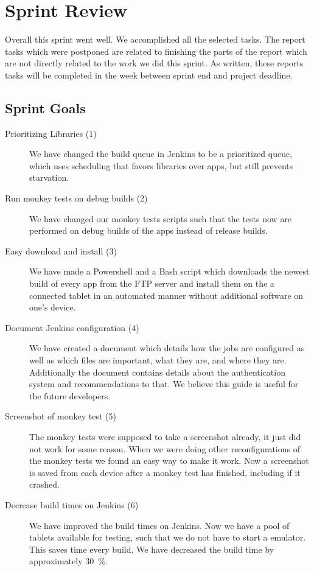\chapter{Sprint Review}\label{chap:sprint4_end}
Overall this sprint went well. We accomplished all the selected tasks. The report tasks which were postponed are related to finishing the parts of the report which are not directly related to the work we did this sprint. As written, these reports tasks will be completed in the week between sprint end and project deadline.

\section{Sprint Goals}\label{sec:s4_goals}
\begin{description}
    \item[Prioritizing Libraries (1)] We have changed the build queue in Jenkins to be a prioritized queue, which uses scheduling that favors libraries over apps, but still prevents starvation.
    \item[Run monkey tests on debug builds (2)] We have changed our monkey tests scripts such that the tests now are performed on debug builds of the apps instead of release builds.
    \item[Easy download and install (3)] We have made a Powershell and a Bash script which downloads the newest build of every app from the FTP server and install them on the a connected tablet in an automated manner without additional software on one's device.
    \item[Document Jenkins configuration (4)] We have created a document which details how the jobs are configured as well as which files are important, what they are, and where they are. Additionally the document contains details about the authentication system and recommendations to that. We believe this guide is useful for the future developers.
    \item[Screenshot of monkey test (5)] The monkey tests were supposed to take a screenshot already, it just did not work for some reason. When we were doing other reconfigurations of the monkey tests we found an easy way to make it work. Now a screenshot is saved from each device after a monkey test has finished, including if it crashed. 
    \item[Decrease build times on Jenkins (6)] We have improved the build times on Jenkins. Now we have a pool of tablets available for testing, such that we do not have to start a emulator. This saves time every build. We have decreased the build time by approximately \SI{30}{\percent}.
\end{description}
